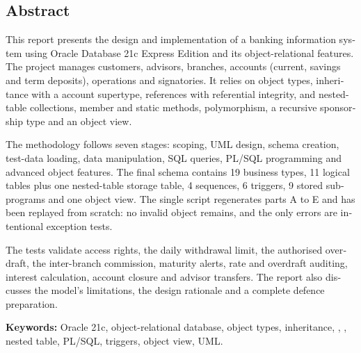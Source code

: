 \begin{otherlanguage}{english}
\chapter*{Abstract}

This report presents the design and implementation of a banking information
system using Oracle Database 21c Express Edition and its object-relational
features. The project manages customers, advisors, branches, accounts (current,
savings and term deposits), operations and signatories. It relies on object
types, inheritance with a  account supertype,
 references with referential integrity,  and nested-table
collections, member and static methods, polymorphism, a recursive sponsorship
type and an object view.

The methodology follows seven stages: scoping, UML design, schema creation,
test-data loading, data manipulation, SQL queries, PL/SQL programming and
advanced object features. The final schema contains 19 business types, 11 logical
tables plus one nested-table storage table, 4 sequences, 6 triggers, 9 stored
subprograms and one object view. The single script
 regenerates parts A to E and has been replayed
from scratch: no invalid object remains, and the only  errors are
intentional exception tests.

The tests validate access rights, the daily withdrawal limit, the authorised
overdraft, the inter-branch commission, maturity alerts, rate and overdraft
auditing, interest calculation, account closure and advisor transfers. The
report also discusses the model's limitations, the design rationale and a
complete defence preparation.

\vspace{0.5cm}
\noindent\textbf{Keywords:} Oracle 21c, object-relational database, object types,
inheritance, , , nested table, PL/SQL, triggers, object
view, UML.
\end{otherlanguage}

\clearpage
